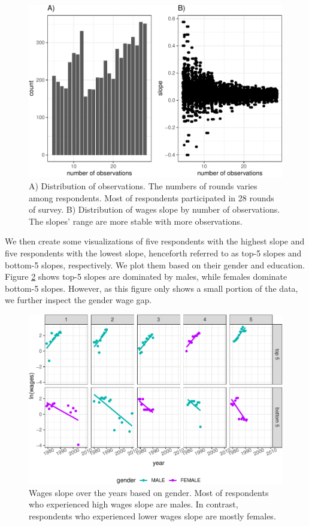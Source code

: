 \documentclass[12pt]{article}
\begin{document}
\begin{figure}

{\centering \includegraphics[width=468px]{figures/slope-nobs-plot-1} 

}

\caption{A) Distribution of observations. The numbers of rounds varies among respondents. Most of respondents participated in 28 rounds of survey. B) Distribution of wages slope by number of observations. The slopes' range are more stable with more observations.}\label{fig:slope-nobs-plot}
\end{figure}

We then create some visualizations of five respondents with the highest slope and five respondents with the lowest slope, henceforth referred to as top-5 slopes and bottom-5 slopes, respectively. We plot them based on their gender and education. Figure \ref{fig:slope-gender} shows top-5 slopes are dominated by males, while females dominate bottom-5 slopes. However, as this figure only shows a small portion of the data, we further inspect the gender wage gap.

\begin{figure}

{\centering \includegraphics[width=468px]{figures/slope-gender-1} 

}

\caption{Wages slope over the years based on gender. Most of respondents who experienced high wages slope are males. In contrast, respondents who experienced lower wages slope are mostly females.}\label{fig:slope-gender}
\end{figure}
\end{document}
